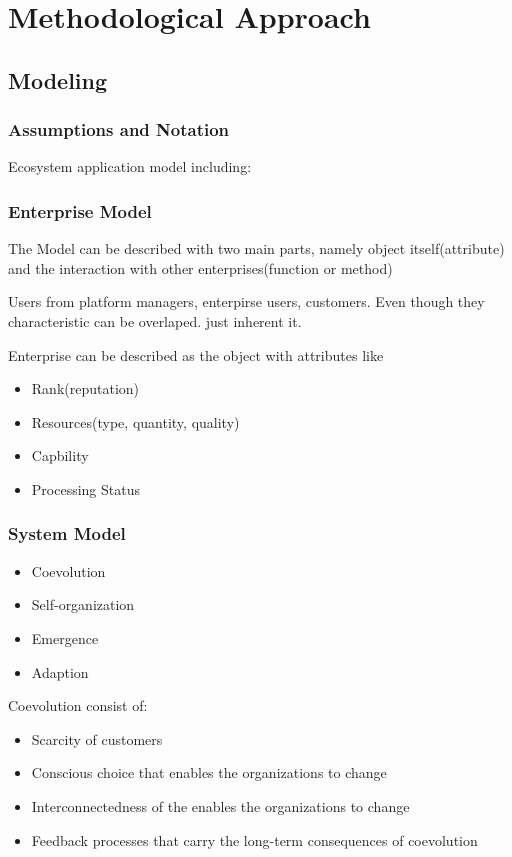 \section{Methodological Approach} %
\label{sec:methodological_approach}

\subsection{Modeling} %
\label{sub:modeling}

\subsubsection{Assumptions and Notation}

Ecosystem application model including:
\subsubsection{Enterprise Model}

The Model can be described with two main parts, namely object itself(attribute) and the interaction with other enterprises(function or method)

Users from platform managers, enterpirse users, customers. Even though they characteristic can be overlaped. just inherent it.

Enterprise can be described as the object with attributes like 
\begin{itemize}
	\item Rank(reputation)
	\item Resources(type, quantity, quality)
	\item Capbility
	\item Processing Status
\end{itemize}


\subsubsection{System Model}
\begin{itemize}
	\item Coevolution
	\item Self-organization
	\item Emergence	
	\item Adaption
\end{itemize}

Coevolution consist of:
\begin{itemize}
	\item Scarcity of customers
	\item Conscious choice that enables the organizations to change
	\item Interconnectedness of the enables the organizations to change
	\item Feedback processes that carry the long-term consequences of coevolution
\end{itemize}

